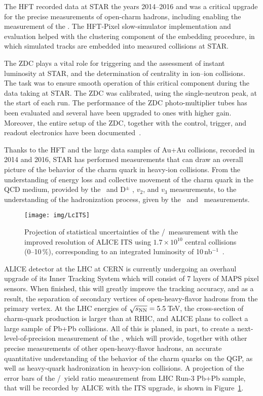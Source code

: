 The HFT recorded data at STAR the years 2014--2016 and was a critical upgrade for the precise measurements of open-charm hadrons, including enabling the measurement of the \Lambdac\@. The HFT-Pixel slow-simulator implementation and evaluation helped with the clustering component of the embedding procedure, in which simulated tracks are embedded into measured collisions at STAR\@. 

The ZDC plays a vital role for triggering and the assessment of instant luminosity at STAR, and the determination of centrality in ion--ion collisions. The task was to ensure smooth operation of this critical component during the data taking at STAR\@. The ZDC was calibrated, using the single-neutron peak, at the start of each run. The performance of the ZDC photo-multiplier tubes has been evaluated and several have been upgraded to ones with higher gain. Moreover, the entire setup of the ZDC, together with the control, trigger, and readout electronics have been documented~\cite{ZDCmanual}\@.

Thanks to the HFT and the large data samples of Au+Au collisions, recorded in 2014 and 2016, STAR has performed measurements that can draw an overall picture of the behavior of the charm quark in heavy-ion collisions. From the understanding of energy loss and collective movement of the charm quark in the QCD medium, provided by the \dzero\ and D$^\pm$ \Raa, $v_2$, and $v_3$ measurements, to the understanding of the hadronization process, given by the \Lambdac\ and \Ds\ measurements.

\begin{figure}[!htb]
\centering
\texttt{[image: img/LcITS]}
\caption[Projection of statistical uncertainties of the \Lambdac/\dzero\ measurement with the improved resolution of ALICE ITS\@.]{Projection of statistical uncertainties of the \Lambdac/\dzero\ measurement with the improved resolution of ALICE ITS using $1.7\times 10^{10}$ central collisions (0--10$\,\%$), corresponding to an integrated luminosity of 10$\,$nb$^{-1}$~\cite{ITS_CDR}.}
\label{ITS_Lc_conclusion}
\end{figure}

ALICE detector at the LHC at CERN is currently undergoing an overhaul upgrade of its Inner Tracking System which will consist of 7 layers of MAPS pixel sensors. When finished, this will greatly improve the tracking accuracy, and as a result, the separation of secondary vertices of open-heavy-flavor hadrons from the primary vertex. At the LHC energies of $\sqrt{s_\text{NN}} = 5.5\,$TeV, the cross-section of charm-quark production is larger than at RHIC, and ALICE plans to collect a large sample of Pb+Pb collisions. All of this is planed, in part, to create a next-level-of-precision measurement of the \Lambdac, which will provide, together with other precise measurements of other open-heavy-flavor hadrons, an accurate quantitative understanding of the behavior of the charm quarks on the QGP, as well as heavy-quark hadronization in heavy-ion collisions. A projection of the error bars of the \Lambdac/\dzero\ yield ratio measurement from LHC Run-3 Pb+Pb sample, that will be recorded by ALICE with the ITS upgrade, is shown in Figure~\ref{ITS_Lc_conclusion}\@.

